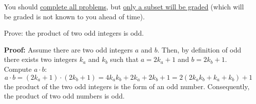 \medskip
\noindent You should \underline{complete all problems}, but \underline{only a
subset will be graded} (which will be graded is not known to you ahead of
time).
\fi
\begin{questions}

\ifprintanswers
\else
{}





\fi


 Prove: the product of two odd integers is odd. 
    \ifprintanswers
        \vspace{-10pt}
    \fi
\begin{solution} 
\textbf{Proof:} Assume there are two odd integers $a$ and $b$.  Then, by definition of odd there exists two integers $k_a$ and $k_b$ such that $a=2k_a + 1$ and $b=2k_b + 1$.  Compute $a \cdot b$:
    $$ a\cdot b = (2k_a + 1)\cdot(2k_b + 1) = 4k_ak_b + 2k_a + 2k_b + 1 = 2(2k_ak_b + k_a + k_b) + 1$$
    the product of the two odd integers is the form of an odd number.
    Consequently, the product of two odd numbers is odd.
\end{solution}




\end{questions}
